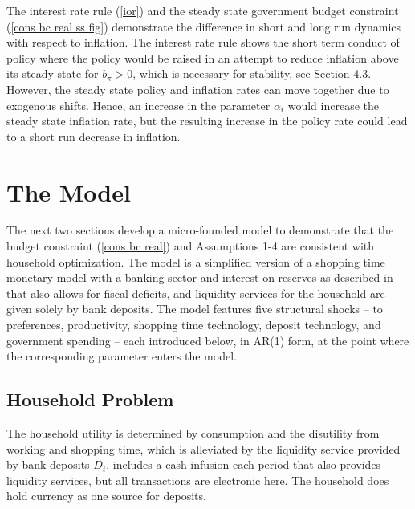 \documentclass[]{article}
\begin{document}
The interest rate rule (\ref{ior}) and the steady state government budget constraint (\ref{cons bc real ss fig}) demonstrate the difference in short and long run dynamics with respect to inflation. The interest rate rule shows the short term conduct of policy where the policy would be raised in an attempt to reduce inflation above its steady state for $b_{\pi}>0$, which is necessary for stability, see Section 4.3. However, the steady state policy and inflation rates can move together due to exogenous shifts. Hence, an increase in the parameter $\alpha_{i}$ would increase the steady state inflation rate, but the resulting increase in the policy rate could lead to a short run decrease in inflation.

\section{The Model}

The next two sections develop a micro-founded model to demonstrate that the budget constraint (\ref{cons bc real}) and Assumptions 1-4 are consistent with household optimization. The model is a simplified version of a shopping time monetary model with a banking sector and interest on reserves as described in \textcite{ireland2014macroeconomics} that also allows for fiscal deficits, and liquidity services for the household are given solely by bank deposits. The model features five structural shocks -- to preferences, productivity, shopping time technology, deposit technology, and government spending -- each introduced below, in AR(1) form, at the point where the corresponding parameter enters the model.

\subsection{Household Problem}

The household utility is determined by consumption and the disutility from
working and shopping time, which is alleviated by the liquidity service provided by
bank deposits $D_{t}$. \textcite{ireland2014macroeconomics} includes a cash infusion each period that also provides liquidity services, but all transactions are electronic here. The household does hold currency as one source for deposits.
\end{document}
